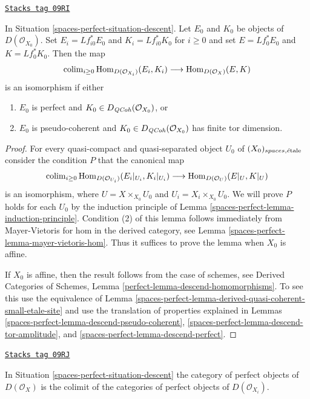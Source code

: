 \begin{lemma}
\label{spaces-perfect-lemma-descend-homomorphisms}
\href{https://stacks.math.columbia.edu/tag/09RI}{\texttt{Stacks tag 09RI}}

In Situation \ref{spaces-perfect-situation-descent}. Let $E_0$ and $K_0$ be objects of
$D(\mathcal{O}_{X_0})$. Set $E_i = Lf_{i0}^*E_0$ and $K_i = Lf_{i0}^*K_0$
for $i \geq 0$ and set $E = Lf_0^*E_0$ and $K = Lf_0^*K_0$. Then the map
$$
\operatorname{colim}_{i \geq 0} \operatorname{Hom}_{D(\mathcal{O}_{X_i})}(E_i, K_i)
\longrightarrow
\operatorname{Hom}_{D(\mathcal{O}_X)}(E, K)
$$
is an isomorphism if either
\begin{enumerate}
\item $E_0$ is perfect and $K_0 \in D_{\mathit{QCoh}}(\mathcal{O}_{X_0})$, or
\item $E_0$ is pseudo-coherent and
$K_0 \in D_{\mathit{QCoh}}(\mathcal{O}_{X_0})$ has finite tor dimension.
\end{enumerate}
\end{lemma}

\begin{proof}
For every quasi-compact and quasi-separated object $U_0$ of
$(X_0)_{spaces, \acute{e}\text{tale}}$ consider the condition $P$ that the canonical
map
$$
\operatorname{colim}_{i \geq 0} \operatorname{Hom}_{D(\mathcal{O}_{U_i})}(E_i|_{U_i}, K_i|_{U_i})
\longrightarrow
\operatorname{Hom}_{D(\mathcal{O}_U)}(E|_U, K|_U)
$$
is an isomorphism, where $U = X \times_{X_0} U_0$ and
$U_i = X_i \times_{X_0} U_0$. We will prove $P$ holds for each $U_0$
by the induction principle of Lemma \ref{spaces-perfect-lemma-induction-principle}.
Condition (2) of this lemma follows immediately from Mayer-Vietoris
for hom in the derived category, see Lemma \ref{spaces-perfect-lemma-mayer-vietoris-hom}.
Thus it suffices to prove the lemma when $X_0$ is affine.

\medskip\noindent
If $X_0$ is affine, then the result follows from the case of schemes, see
Derived Categories of Schemes, Lemma \ref{perfect-lemma-descend-homomorphisms}.
To see this use the equivalence of
Lemma \ref{spaces-perfect-lemma-derived-quasi-coherent-small-etale-site}
and use the translation of properties explained in
Lemmas \ref{spaces-perfect-lemma-descend-pseudo-coherent},
\ref{spaces-perfect-lemma-descend-tor-amplitude}, and
\ref{spaces-perfect-lemma-descend-perfect}.
\end{proof}

\begin{lemma}
\label{spaces-perfect-lemma-perfect-on-limit}
\href{https://stacks.math.columbia.edu/tag/09RJ}{\texttt{Stacks tag 09RJ}}

In Situation \ref{spaces-perfect-situation-descent} the category of perfect
objects of $D(\mathcal{O}_X)$ is the colimit of the categories
of perfect objects of $D(\mathcal{O}_{X_i})$.
\end{lemma}

